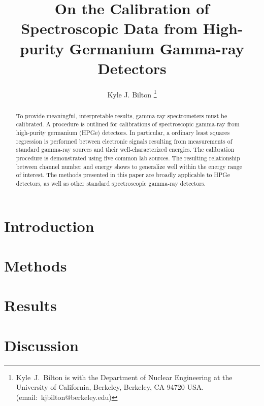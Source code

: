 \documentclass[journal]{IEEEtran}
\title{On the Calibration of Spectroscopic Data from High-purity Germanium Gamma-ray Detectors}
\author{Kyle J. Bilton%
\thanks{Kyle~J.~Bilton is with the Department of Nuclear Engineering at the University of California, Berkeley, Berkeley, CA 94720 USA. (email:~\mbox{kjbilton@berkeley.edu})}}
\begin{document}
\maketitle

\begin{abstract}
To provide meaningful, interpretable results, gamma-ray spectrometers must be calibrated.
A procedure is outlined for calibrations of spectroscopic gamma-ray from high-purity germanium (HPGe) detectors.
In particular, a ordinary least squares regression is performed between electronic signals resulting from measurements of standard gamma-ray sources and their well-characterized energies.
The calibration procedure is demonstrated using five common lab sources.
The resulting relationship between channel number and energy shows to generalize well within the energy range of interest.
The methods presented in this paper are broadly applicable to HPGe detectors, as well as other standard spectroscopic gamma-ray detectors.
\end{abstract}


\section{Introduction}
\label{sec:intro}


\section{Methods}
\label{sec:meth}


\section{Results}
\label{sec:res}


\section{Discussion}
\label{sec:disc}




\end{document}
